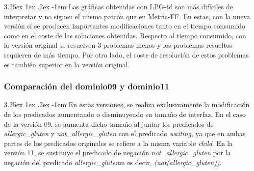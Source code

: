 \documentclass{article}
\makeatletter
\renewcommand\paragraph{\@startsection{paragraph}{5}{\z@}%
  {3.25ex \@plus1ex \@minus.2ex}%
  {-1em}%
  {\normalfont\normalsize\bfseries}}
\makeatother
\begin{document}
\paragraph{}
Las gráficas obtenidas con LPG-td son más difíciles de interpretar y no siguen el mismo patrón que en Metric-FF. En estas, con la nueva versión sí se producen importantes modificaciones tanto en el tiempo consumido como en el coste de las soluciones obtenidas. Respecto al tiempo consumido, con la versión original se resuelven 3 problemas menos y los problemas resueltos requieren de más tiempo. Por otro lado, el coste de resolución de estos problemas es también superior en la versión original.

\subsubsection{Comparación del dominio09 y dominio11}
\paragraph{}
En estas versiones, se realiza exclusivamente la modificación de los predicados aumentando o disminuyendo su tamaño de interfaz. En el caso de la versión 09, se aumenta dicho tamaño al juntar los predicados de \textit{allergic\_gluten} y \textit{not\_allergic\_gluten} con el predicado \textit{waiting}, ya que en ambas partes de los predicados originales se refiere a la misma variable \textit{child}. En la versión 11, se sustituye el predicado de negación \textit{not\_allergic\_gluten} por la negación del predicado \textit{allergic\_gluten}m es decir, \textit{(not(allergic\_gluten))}.

\pagebreak
\end{document}
